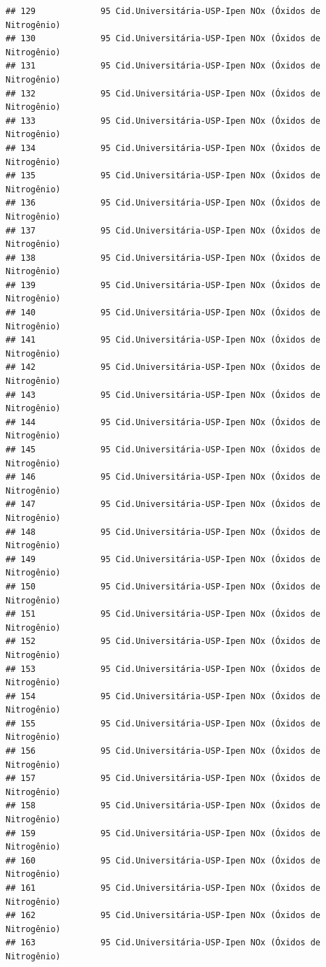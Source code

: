 \documentclass[]{book}
\begin{document}
\begin{verbatim}
## 129             95 Cid.Universitária-USP-Ipen NOx (Óxidos de Nitrogênio)
## 130             95 Cid.Universitária-USP-Ipen NOx (Óxidos de Nitrogênio)
## 131             95 Cid.Universitária-USP-Ipen NOx (Óxidos de Nitrogênio)
## 132             95 Cid.Universitária-USP-Ipen NOx (Óxidos de Nitrogênio)
## 133             95 Cid.Universitária-USP-Ipen NOx (Óxidos de Nitrogênio)
## 134             95 Cid.Universitária-USP-Ipen NOx (Óxidos de Nitrogênio)
## 135             95 Cid.Universitária-USP-Ipen NOx (Óxidos de Nitrogênio)
## 136             95 Cid.Universitária-USP-Ipen NOx (Óxidos de Nitrogênio)
## 137             95 Cid.Universitária-USP-Ipen NOx (Óxidos de Nitrogênio)
## 138             95 Cid.Universitária-USP-Ipen NOx (Óxidos de Nitrogênio)
## 139             95 Cid.Universitária-USP-Ipen NOx (Óxidos de Nitrogênio)
## 140             95 Cid.Universitária-USP-Ipen NOx (Óxidos de Nitrogênio)
## 141             95 Cid.Universitária-USP-Ipen NOx (Óxidos de Nitrogênio)
## 142             95 Cid.Universitária-USP-Ipen NOx (Óxidos de Nitrogênio)
## 143             95 Cid.Universitária-USP-Ipen NOx (Óxidos de Nitrogênio)
## 144             95 Cid.Universitária-USP-Ipen NOx (Óxidos de Nitrogênio)
## 145             95 Cid.Universitária-USP-Ipen NOx (Óxidos de Nitrogênio)
## 146             95 Cid.Universitária-USP-Ipen NOx (Óxidos de Nitrogênio)
## 147             95 Cid.Universitária-USP-Ipen NOx (Óxidos de Nitrogênio)
## 148             95 Cid.Universitária-USP-Ipen NOx (Óxidos de Nitrogênio)
## 149             95 Cid.Universitária-USP-Ipen NOx (Óxidos de Nitrogênio)
## 150             95 Cid.Universitária-USP-Ipen NOx (Óxidos de Nitrogênio)
## 151             95 Cid.Universitária-USP-Ipen NOx (Óxidos de Nitrogênio)
## 152             95 Cid.Universitária-USP-Ipen NOx (Óxidos de Nitrogênio)
## 153             95 Cid.Universitária-USP-Ipen NOx (Óxidos de Nitrogênio)
## 154             95 Cid.Universitária-USP-Ipen NOx (Óxidos de Nitrogênio)
## 155             95 Cid.Universitária-USP-Ipen NOx (Óxidos de Nitrogênio)
## 156             95 Cid.Universitária-USP-Ipen NOx (Óxidos de Nitrogênio)
## 157             95 Cid.Universitária-USP-Ipen NOx (Óxidos de Nitrogênio)
## 158             95 Cid.Universitária-USP-Ipen NOx (Óxidos de Nitrogênio)
## 159             95 Cid.Universitária-USP-Ipen NOx (Óxidos de Nitrogênio)
## 160             95 Cid.Universitária-USP-Ipen NOx (Óxidos de Nitrogênio)
## 161             95 Cid.Universitária-USP-Ipen NOx (Óxidos de Nitrogênio)
## 162             95 Cid.Universitária-USP-Ipen NOx (Óxidos de Nitrogênio)
## 163             95 Cid.Universitária-USP-Ipen NOx (Óxidos de Nitrogênio)

\end{verbatim}
\end{document}

